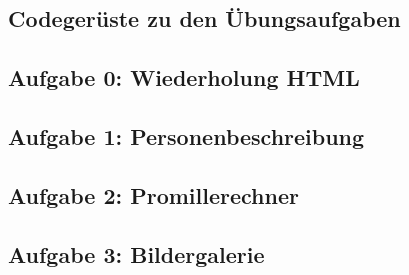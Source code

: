 \begin{appendices}
\section{Codegerüste zu den Übungsaufgaben}
\label{app:codegerüste}

\subsection{Aufgabe 0: Wiederholung HTML}
\label{app:code0}




\subsection{Aufgabe 1: Personenbeschreibung}
\label{app:code1}






\subsection{Aufgabe 2: Promillerechner}
\label{app:code2}






\subsection{Aufgabe 3: Bildergalerie}
\label{app:code3}







\end{appendices}
